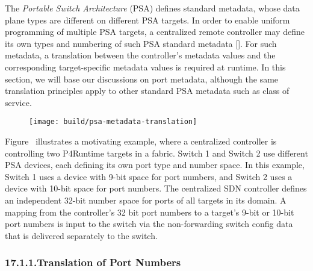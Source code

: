 \documentclass[11pt]{article}
\begin{document}
{%
\noindent{}The \emph{Portable Switch Architecture} (PSA) defines standard metadata, whose
data plane types are different on different PSA targets. In order to enable
uniform programming of multiple PSA targets, a centralized remote controller may
define its own types and numbering of such PSA standard metadata
[]. For such metadata, a translation between the controller's
metadata values and the corresponding target-specific metadata values is
required at runtime. In this section, we will base our discussions on port
metadata, although the same translation principles apply to other standard PSA
metadata such as class of service.%

\begin{figure}[tbp]%
\begin{mdcenter}%

\noindent{}\texttt{[image: build/psa-metadata-translation]}{}%

\mdhr{}%

\noindent{}%
\end{mdcenter}\label{fig-psa-metadata-translation}%
\end{figure}%

\noindent{}Figure~ illustrates a motivating example,
where a centralized controller is controlling two P4Runtime targets in a fabric.
Switch 1 and Switch 2 use different PSA devices, each defining its own port type
and number space. In this example, Switch 1 uses a device with 9-bit space for
port numbers, and Switch 2 uses a device with 10-bit space for port numbers. The
centralized SDN controller defines an independent 32-bit number space for ports
of all targets in its domain. A mapping from the controller's 32 bit port
numbers to a target's 9-bit or 10-bit port numbers is input to the switch via
the non-forwarding switch config data that is delivered separately to the
switch.%

\subsubsection{17.1.1.\hspace*{0.5em}Translation of Port Numbers}\label{sec-translation-of-port-numbers}%

}
\end{document}
